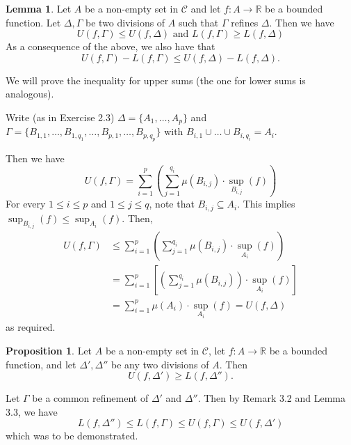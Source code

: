 \documentclass[11pt]{article}
\makeatletter
\theoremstyle{definition}
\newtheorem{prop}[thm]{Proposition}
\newtheorem{lemma}[thm]{Lemma}
\newcommand{\R}{\ensuremath{\mathbb{R}}}
\newenvironment{pf}[1][\proofname]{\par
  \pushQED{\qed}%
  \normalfont \topsep0\p@\relax
  \trivlist
  \item[\hskip\labelsep\itshape
  #1\@addpunct{.}]\ignorespaces
}{%
  \popQED\endtrivlist\@endpefalse
}
\makeatother
\begin{document}
\begin{lemma}
Let $A$ be a non-empty set in $\mathcal{C}$ and let $f : A \to \R$ be a bounded function. Let $\Delta, \Gamma$ be two divisions of $A$ such that $\Gamma$ refines $\Delta$. Then we have
$$U(f, \Gamma) \leq U(f, \Delta) \text{ and } L(f, \Gamma) \geq L(f, \Delta)$$
As a consequence of the above, we also have that
$$U(f, \Gamma) - L(f, \Gamma) \leq U(f, \Delta) - L(f, \Delta).$$
\end{lemma}
\begin{pf}
We will prove the inequality for upper sums (the one for lower sums is analogous).

Write (as in Exercise 2.3) $\Delta = \{A_1, \dots, A_p\}$ and $\Gamma = \{B_{1, 1}, \dots, B_{1, q_1}, \dots, B_{p, 1}, \dots, B_{p, q_p}\}$ with $B_{i, 1} \cup \dots \cup B_{i, q_i} = A_i$.

Then we have
$$U(f, \Gamma) = \sum_{i=1}^p \left( \sum_{j=1}^{q_i} \mu(B_{i, j}) \cdot \sup_{B_{i, j}} (f) \right)$$
For every $1 \leq i \leq p$ and $1 \leq j \leq q$, note that $B_{i, j} \subseteq A_i$. This implies $\sup_{B_{i, j}}(f) \leq \sup_{A_i} (f)$. Then,
\begin{align*}
    U(f, \Gamma)
    &\leq \sum_{i=1}^p \left( \sum_{j=1}^{q_i} \mu(B_{i, j}) \cdot \sup_{A_i} (f) \right) \\
    &= \sum_{i=1}^p \left[ \left( \sum_{j=1}^{q_i} \mu(B_{i, j}) \right) \cdot \sup_{A_i} (f) \right] \\
    &= \sum_{i=1}^p \mu(A_i) \cdot \sup_{A_i} (f) = U(f, \Delta)
\end{align*}
as required.
\end{pf}

\begin{prop}
Let $A$ be a non-empty set in $\mathcal{C}$, let $f : A \to \R$ be a bounded function, and let $\Delta', \Delta''$ be any two divisions of $A$. Then 
$$U(f, \Delta') \geq L(f, \Delta'').$$
\end{prop}
\begin{pf} 
Let $\Gamma$ be a common refinement of $\Delta'$ and $\Delta''$. Then by Remark 3.2 and Lemma 3.3, we have
$$L(f, \Delta'') \leq L(f, \Gamma) \leq U(f, \Gamma) \leq U(f, \Delta')$$
which was to be demonstrated.
\end{pf}
\end{document}
